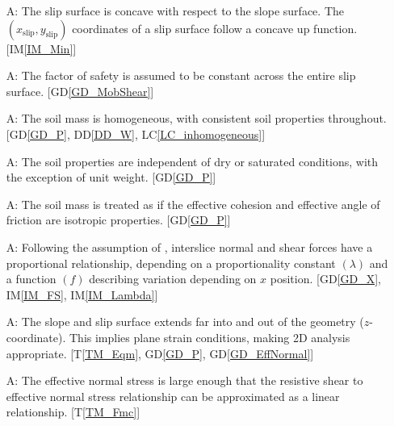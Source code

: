 \documentclass[12pt]{article}
\newcounter{assumpnum} %
\newcommand{\tref}[1]{T\ref{#1}}
\newcommand{\iref}[1]{IM\ref{#1}}
\newcommand{\ddref}[1]{DD\ref{#1}}
\newcommand{\dref}[1]{GD\ref{#1}}
\newcommand{\lcref}[1]{LC\ref{#1}}
\begin{document}
\begin{enumerate}[label=A\arabic*:,ref={\arabic*}]
\item [A\refstepcounter{assumpnum}\theassumpnum: \label{A_Concave}] The
  slip surface is concave with respect to the slope surface. The 
  $(x_{\text{slip}},y_{\text{slip}})$ coordinates of a slip surface follow a 
  concave up 
  function. [\iref{IM_Min}]

\item [A\refstepcounter{assumpnum}\theassumpnum: \label{A_Constant}] The factor 
of safety is assumed to be constant across the entire slip surface. 
[\dref{GD_MobShear}]

\item [A\refstepcounter{assumpnum}\theassumpnum: \label{A_Homo}] The soil mass 
is homogeneous, with consistent soil properties throughout. [\dref{GD_P}, 
\ddref{DD_W}, \lcref{LC_inhomogeneous}]
  
\item [A\refstepcounter{assumpnum}\theassumpnum: \label{A_Saturated}] The soil 
properties are independent of dry or saturated conditions, with the exception 
of unit weight. [\dref{GD_P}]

\item [A\refstepcounter{assumpnum}\theassumpnum: \label{A_Isotropic}]
  The soil mass is treated as if the effective cohesion and effective angle of 
  friction are isotropic properties. [\dref{GD_P}]
  
\item [A\refstepcounter{assumpnum}\theassumpnum: \label{A_Base}]
  Following the assumption of \cite{MorgPrice}, interslice normal and shear 
  forces have a proportional relationship, depending on a proportionality 
  constant $\left({\lambda}\right)$ and a function $\left({f}\right)$ 
  describing variation depending on $x$ position. [\dref{GD_X}, \iref{IM_FS}, 
  \iref{IM_Lambda}]
  
\item [A\refstepcounter{assumpnum}\theassumpnum: \label{A_2D}] The
  slope and slip surface extends far into and out of the geometry
  ($z$-coordinate). This implies plane strain conditions, making 2D
  analysis appropriate. [\tref{TM_Eqm}, \dref{GD_P}, \dref{GD_EffNormal}]

\item [A\refstepcounter{assumpnum}\theassumpnum: \label{A_Lin}] The
  effective normal stress is large enough that the resistive shear to
  effective normal stress relationship can be approximated as a linear
  relationship. [\tref{TM_Fmc}]


\end{enumerate}
\end{document}
